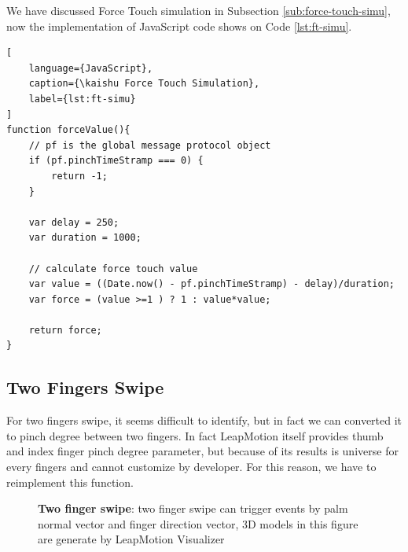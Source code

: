 We have discussed Force Touch simulation in Subsection \ref{sub:force-touch-simu}, now the implementation of JavaScript code shows on Code \ref{lst:ft-simu}.

\begin{lstlisting}[
    language={JavaScript},
    caption={\kaishu Force Touch Simulation},
    label={lst:ft-simu}
]
function forceValue(){
    // pf is the global message protocol object
    if (pf.pinchTimeStramp === 0) {
        return -1;
    }

    var delay = 250;
    var duration = 1000;

    // calculate force touch value
    var value = ((Date.now() - pf.pinchTimeStramp) - delay)/duration;
    var force = (value >=1 ) ? 1 : value*value;

    return force;
}
\end{lstlisting}

\subsection{Two Fingers Swipe}

For two fingers swipe, it seems difficult to identify, but in fact we can converted it to pinch degree between two fingers.
In fact LeapMotion itself provides thumb and index finger pinch degree parameter, but because of its results is universe for every fingers and cannot customize by developer. For this reason, we have to reimplement this function.

\begin{figure}[H]
\kaishu
\centering
{}
\caption{\textbf{Two finger swipe}: two finger swipe can trigger events by palm normal vector and finger direction vector, 3D models in this figure are generate by LeapMotion Visualizer}
\label{fig:pinch}
\end{figure}


